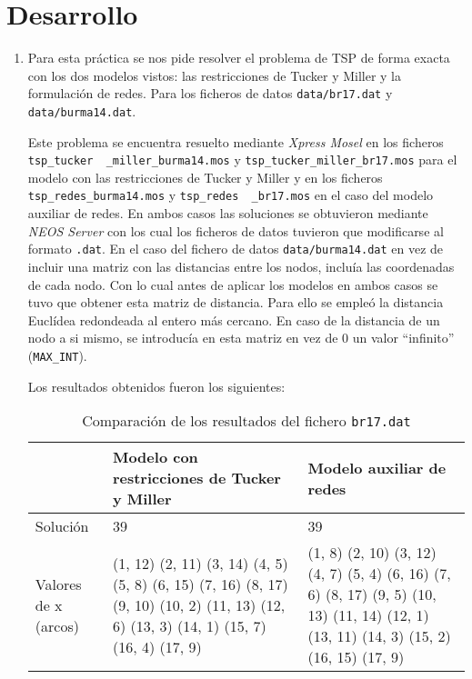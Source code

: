 \documentclass[a4paper,11pt]{article}
\begin{document}
\section{Desarrollo}
\begin{enumerate}
\item Para esta práctica se nos pide resolver el problema de TSP de forma exacta con los dos modelos vistos: las restricciones de Tucker y Miller y la formulación de redes. Para los ficheros de datos \texttt{data/br17.dat} y \texttt{data/burma14.dat}.

Este problema se encuentra resuelto mediante \textit{Xpress Mosel} en los ficheros \texttt{tsp\_tucker \ \_miller\_burma14.mos} y \texttt{tsp\_tucker\_miller\_br17.mos} para el modelo con las restricciones de Tucker y Miller y en los ficheros \texttt{tsp\_redes\_burma14.mos} y \texttt{tsp\_redes \ \_br17.mos} en el caso del modelo auxiliar de redes. En ambos casos las soluciones se obtuvieron mediante \textit{NEOS Server} con los cual los ficheros de datos tuvieron que modificarse al formato \texttt{.dat}. En el caso del fichero de datos \texttt{data/burma14.dat} en vez de incluir una matriz con las distancias entre los nodos, incluía las coordenadas de cada nodo. Con lo cual antes de aplicar los modelos en ambos casos se tuvo que obtener esta matriz de distancia. Para ello se empleó la distancia Euclídea redondeada al entero más cercano. En caso de la distancia de un nodo a si mismo, se introducía en esta matriz en vez de 0 un valor ``infinito'' (\texttt{MAX\_INT}).

Los resultados obtenidos fueron los siguientes:

\newpage %

\begin{table}[!htbp]
\label{results_100}
\centering
\begin{tabularx}{\textwidth}{|p{2cm}|X|X|}
\hline
& Modelo con restricciones de Tucker y Miller & Modelo auxiliar de redes \\ \hline
Solución	& 39	& 39	\\ \hline
Valores de x (arcos)	& (1, 12) (2, 11) (3, 14) (4, 5) (5, 8) (6, 15) (7, 16) (8, 17) (9, 10) (10, 2) (11, 13) (12, 6) (13, 3) (14, 1) (15, 7) (16, 4) (17, 9)	& (1, 8) (2, 10) (3, 12) (4, 7) (5, 4) (6, 16) (7, 6) (8, 17) (9, 5) (10, 13) (11, 14) (12, 1) (13, 11) (14, 3) (15, 2) (16, 15) (17, 9) \\ \hline
\end{tabularx}
\caption{Comparación de los resultados del fichero \texttt{br17.dat}}
\end{table}


\end{enumerate}
\end{document}
